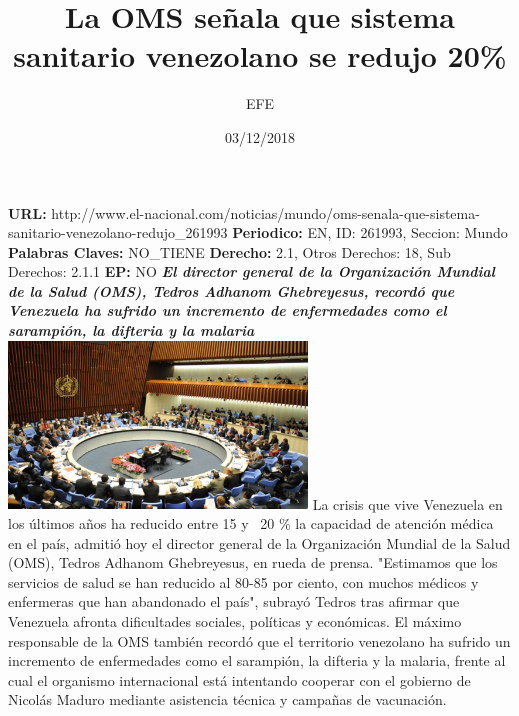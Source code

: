 \documentclass{article}%
\title{\textbf{La OMS señala que sistema sanitario venezolano se redujo 20\%}}%
\author{EFE}%
\date{03/12/2018}%
\begin{document}
%
\normalsize%
\maketitle%
\textbf{URL: }%
http://www.el{-}nacional.com/noticias/mundo/oms{-}senala{-}que{-}sistema{-}sanitario{-}venezolano{-}redujo\_261993\newline%
%
\textbf{Periodico: }%
EN, %
ID: %
261993, %
Seccion: %
Mundo\newline%
%
\textbf{Palabras Claves: }%
NO\_TIENE\newline%
%
\textbf{Derecho: }%
2.1, %
Otros Derechos: %
18, %
Sub Derechos: %
2.1.1\newline%
%
\textbf{EP: }%
NO\newline%
\newline%
%
\textbf{\textit{El director general de la Organización Mundial de la Salud (OMS), Tedros Adhanom Ghebreyesus, recordó que Venezuela ha sufrido un incremento de enfermedades como el sarampión, la difteria y la malaria~}}%
\newline%
\newline%
%
\includegraphics[width=300px]{78.jpg}%
\newline%
%
La crisis que vive Venezuela en los últimos años ha reducido entre 15 y ~20 \% la capacidad de atención médica en el país, admitió hoy el director general de la Organización Mundial de la Salud (OMS), Tedros Adhanom Ghebreyesus, en rueda de prensa.%
\newline%
%
"Estimamos que los servicios de salud se han reducido al 80{-}85 por ciento, con muchos médicos y enfermeras que han abandonado el país", subrayó Tedros tras afirmar que Venezuela afronta dificultades sociales, políticas y económicas.%
\newline%
%
El máximo responsable de la OMS también recordó que el territorio venezolano ha sufrido un incremento de enfermedades como el sarampión, la difteria y la malaria, frente al cual el organismo internacional está intentando cooperar con el gobierno de Nicolás Maduro mediante asistencia técnica y campañas de vacunación.%
\newline%
\end{document}
